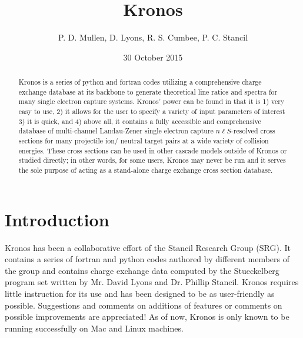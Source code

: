 \documentclass[twocolumn, prb, amsmath,amssymb,amsfonts]{revtex4}
\begin{document}
\title{Kronos}
\author{P. D. Mullen, D. Lyons, R. S. Cumbee, P. C. Stancil}
\date{30 October 2015}

\begin{abstract}
Kronos is a series of python and fortran codes utilizing a comprehensive charge exchange database at its backbone to generate theoretical line ratios and spectra for many single electron capture systems.  Kronos' power can be found in that it is 1) very easy to use, 2) it allows for the user to specify a variety of input parameters of interest 3) it is quick, and 4) above all,  it contains a fully accessible and comprehensive database of multi-channel Landau-Zener single electron capture $n \ell S$-resolved cross sections for many projectile ion/ neutral target pairs at a wide variety of collision energies.  These cross sections can be used in other cascade models outside of Kronos or studied directly; in other words, for some users, Kronos may never be run and it serves the sole purpose of acting as a stand-alone charge exchange cross section database.  
\end{abstract}

\maketitle
\section{Introduction}
Kronos has been a collaborative effort of the Stancil Research Group (SRG).  It contains a series of fortran and python codes authored by different members of the group and contains charge exchange data computed by the Stueckelberg program set written by Mr. David Lyons and Dr. Phillip Stancil.  Kronos requires little instruction for its use and has been designed to be as user-friendly as possible.  Suggestions and comments on additions of features or comments on possible improvements are appreciated! As of now, Kronos is only known to be running successfully on Mac and Linux machines.  
\end{document}
